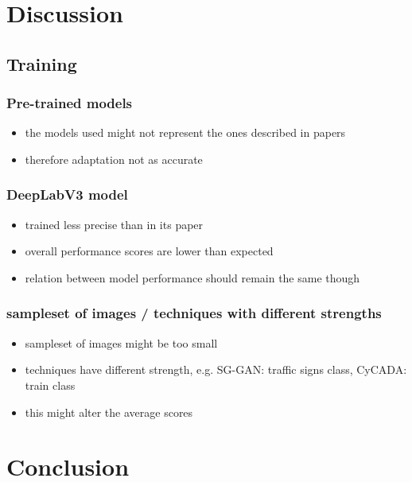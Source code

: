 \documentclass{beamer}
\begin{document}
\begin{frame}
\begin{columns}[c]
\begin{table}
\begin{tabular}{c}
		\end{tabular}
	\end{table}
\end{columns}
\end{frame}

\section{Discussion}

\subsection{Training}

\begin{frame}
\frametitle{Pre-trained models}
\begin{itemize}
	\item the models used might not represent the ones described in papers
	\item therefore adaptation not as accurate
\end{itemize}
\end{frame}

\begin{frame}
\frametitle{DeepLabV3 model}
\begin{itemize}
	\item trained less precise than in its paper
	\item overall performance scores are lower than expected
	\item relation between model performance should remain the same though
\end{itemize}
\end{frame}

\begin{frame}
\frametitle{sampleset of images / techniques with different strengths}
\begin{itemize}
	\item sampleset of images might be too small
	\item techniques have different strength, e.g. SG-GAN: traffic signs class, CyCADA: train class
	\item this might alter the average scores
\end{itemize}
\end{frame}

\section{Conclusion}
\end{document}
